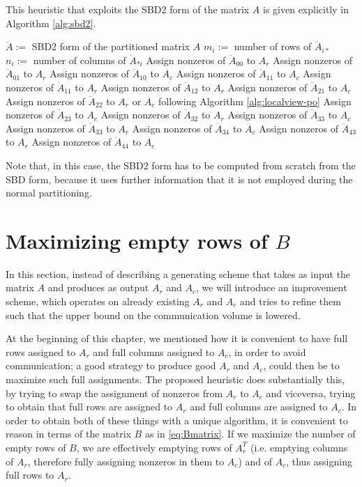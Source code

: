 This heuristic that exploits the SBD2 form of the matrix $A$ is given explicitly in Algorithm \ref{alg:sbd2}.

\begin{algorithm}[h]
	\begin{algorithmic}
		\State
		\State $\ddot{A}:=$ SBD2 form of the partitioned matrix $A$
		\State $m_i := $ number of rows of $\ddot{A}_{i*}$
		\State $n_i := $ number of columns of $\ddot{A}_{*i}$
		\State
		\State Assign nonzeros of $\ddot{A}_{00}$ to $A_r$
		\State Assign nonzeros of $\ddot{A}_{01}$ to $A_r$
		\State Assign nonzeros of $\ddot{A}_{10}$ to $A_c$
		\State Assign nonzeros of $\ddot{A}_{11}$ to $A_c$
		\Else
		\State Assign nonzeros of $\ddot{A}_{11}$ to $A_r$
		\EndIf
		\State Assign nonzeros of $\ddot{A}_{12}$ to $A_r$
		\State Assign nonzeros of $\ddot{A}_{21}$ to $A_c$
		\State Assign nonzeros of $\ddot{A}_{22}$ to $A_r$ or $A_c$ following Algorithm \ref{alg:localview-po}
		\State Assign nonzeros of $\ddot{A}_{23}$ to $A_c$
		\State Assign nonzeros of $\ddot{A}_{32}$ to $A_r$
		\State Assign nonzeros of $\ddot{A}_{33}$ to $A_c$
		\Else
		\State Assign nonzeros of $\ddot{A}_{33}$ to $A_r$
		\EndIf
		\State Assign nonzeros of $\ddot{A}_{34}$ to $A_c$
		\State Assign nonzeros of $\ddot{A}_{43}$ to $A_r$
		\State Assign nonzeros of $\ddot{A}_{44}$ to $A_c$
\end{algorithmic}
\end{algorithm}

Note that, in this case, the SBD2 form has to be computed from scratch from the SBD form, because it uses further information that it is not employed during the normal partitioning.


\section{Maximizing empty rows of $B$} \label{sec:globalview}

In this section, instead of describing a generating scheme that takes as input the matrix $A$ and produces as output $A_r$ and $A_c$, we will introduce an improvement scheme, which operates on already existing $A_r$ and $A_c$ and tries to refine them such that the upper bound on the communication volume is lowered.

At the beginning of this chapter, we mentioned how it is convenient to have full rows assigned to $A_r$ and full columns assigned to $A_c$, in order to avoid communication; a good strategy to produce good $A_r$ and $A_c$, could then be to maximize such full assignments. The proposed heuristic does substantially this, by trying to swap the assignment of nonzeros from $A_r$ to $A_c$ and viceversa, trying to obtain that full rows are assigned to $A_r$ and full columns are assigned to $A_c$. In order to obtain both of these things with a unique algorithm, it is convenient to reason in terms of the matrix $B$ as in \eqref{eq:Bmatrix}. If we maximize the number of empty rows of $B$, we are effectively emptying rows of $A_r^T$ (i.e. emptying columns of $A_r$, therefore fully assigning nonzeros in them to $A_c$) and of $A_c$, thus assigning full rows to $A_r$.

